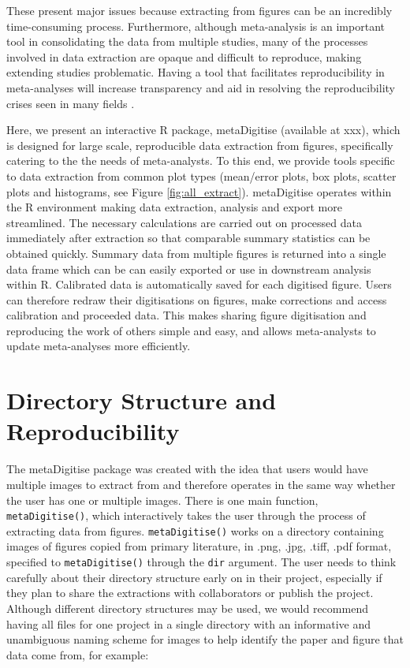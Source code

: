 \documentclass[12pt]{article}
\newcommand{\code}[1]{\texttt{#1}}
\newcommand{\fct}[1]{\texttt{#1()}}
\newcommand{\pkg}[1]{{\fontseries{b}\selectfont #1}}
\let\proglang=\textsf
\begin{document}
These present major issues because extracting from figures can be an incredibly time-consuming process. Furthermore, although meta-analysis is an important tool in consolidating the data from multiple studies, many of the processes involved in data extraction are opaque and difficult to reproduce, making extending studies problematic. Having a tool that facilitates reproducibility in meta-analyses will increase transparency and aid in resolving the reproducibility crises seen in many fields \citep{peng_reproducible_2006, peng_reproducible_2011, sandve_ten_2013, Parker2016,Ihle2017}.


Here, we present an interactive \proglang{R} package, \pkg{metaDigitise} (available at xxx), which is designed for large scale, reproducible data extraction from figures, specifically catering to the the needs of meta-analysts. To this end, we provide tools specific to data extraction from common plot types (mean/error plots, box plots, scatter plots and histograms, see Figure \ref{fig:all_extract}). \pkg{metaDigitise} operates within the \proglang{R} environment making data extraction, analysis and export more streamlined. The necessary calculations are carried out on processed data immediately after extraction so that comparable summary statistics can be obtained quickly. Summary data from multiple figures is returned into a single data frame which can be can easily exported or use in downstream analysis within \proglang{R}. Calibrated data is automatically saved for each digitised figure. Users can therefore redraw their digitisations on figures, make corrections and access calibration and proceeded data. This makes sharing figure digitisation and reproducing the work of others simple and easy, and allows meta-analysts to update meta-analyses more efficiently.




\section{Directory Structure and Reproducibility}
The \pkg{metaDigitise} package was created with the idea that users would have multiple images to extract from and therefore operates in the same way whether the user has one or multiple images. There is one main function, \fct{metaDigitise}, which interactively takes the user through the process of extracting data from figures. \fct{metaDigitise} works on a directory containing images of figures copied from primary literature, in .png, .jpg, .tiff, .pdf format, specified to \fct{metaDigitise} through the \code{dir} argument. The user needs to think carefully about their directory structure early on in their project, especially if they plan to share the extractions with collaborators or publish the project. Although different directory structures may be used, we would recommend having all files for one project in a single directory with an informative and unambiguous naming scheme for images to help identify the paper and figure that data come from, for example:
\end{document}
